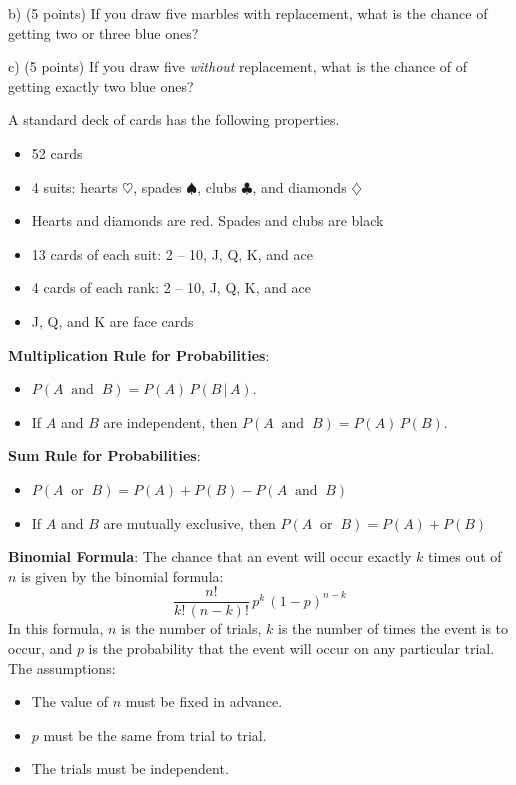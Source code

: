 \documentclass[10pt]{article}
\begin{document}
\hspace{10pt} b) (5 points) If you draw five marbles with replacement, what is the chance of getting 
 two or three blue ones?
\vspace{2.3in}

\hspace{10pt} c) (5 points) If you draw five  \textit{without} replacement, what is the chance of 
of getting  exactly two blue ones?

\vfill
\eject
 A standard deck of cards has the following properties.
\begin{itemize}
\item 52 cards
\item 4 suits:  hearts $\heartsuit$, spades $\spadesuit$, clubs $\clubsuit$,
  and diamonds $\diamondsuit$
\item Hearts and diamonds are red.  Spades and clubs are black
\item 13 cards of each suit:  2 -- 10, J, Q, K, and ace
\item 4 cards of each rank:  2 -- 10, J, Q, K, and ace
\item J, Q, and K are face cards
\end{itemize}

\textbf{Multiplication Rule for Probabilities}:  
\begin{itemize}
\item $P(A\;\;\mbox{and}\;\;B)=P(A)\,P(B\,\vert\,A)$.
\item If $A$ and $B$ are independent, then $P(A\;\;\mbox{and}\;\;B)=P(A)\,P(B)$.
\end{itemize}
\textbf{Sum Rule for Probabilities}:
\begin{itemize}
\item $P(A\;\;\mbox{or}\;\;B)=P(A)+P(B) - P(A\;\;\mbox{and}\;\;B)$
\item If $A$ and $B$ are mutually exclusive, then $P(A\;\;\mbox{or}\;\;B)=P(A)+P(B)$
\end{itemize}  
\bigskip


\textbf{Binomial Formula}:
The chance that an event will occur exactly $k$ times out of $n$ is given by 
the binomial formula:
\[\frac{n!}{k!\,(n-k)!}\,p^k\,(1-p)^{n-k}\]
In this formula, $n$ is the number of trials, $k$ is the number of times
the event is to occur, and $p$ is the probability that the event will occur
on any particular trial.    The assumptions:
\begin{itemize}
\item The value of $n$ must be fixed in advance.
\item $p$ must be the same from trial to trial.
\item The trials must be independent.
\end{itemize}
\end{document}
